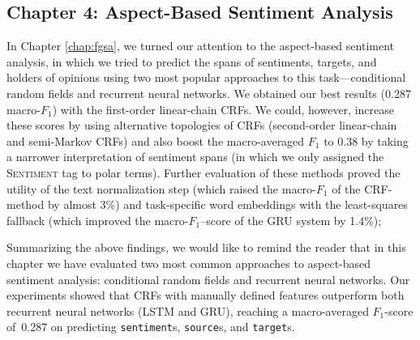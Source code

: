 \documentclass[11pt]{article}
\newcommand{\F}[0]{$F_1$}
\newcommand{\markable}[1]{\texttt{#1}}
\begin{document}
\subsection{Chapter 4: Aspect-Based Sentiment Analysis}

In Chapter \ref{chap:fgsa}, we turned our attention to the
aspect-based sentiment analysis, in which we tried to predict the
spans of sentiments, targets, and holders of opinions using two most
popular approaches to this task---conditional random fields and
recurrent neural networks.  We obtained our best results (0.287
macro-\F{}) with the first-order linear-chain CRFs.  We could,
however, increase these scores by using alternative topologies of CRFs
(second-order linear-chain and semi-Markov CRFs) and also boost the
macro-averaged \F{} to 0.38 by taking a narrower interpretation of
sentiment spans (in which we only assigned the \textsc{Sentiment} tag
to polar terms).  Further evaluation of these methods proved the
utility of the text normalization step (which raised the macro-\F{} of
the CRF-method by almost 3\%) and task-specific word embeddings with
the least-squares fallback (which improved the macro-\F{}--score of
the GRU system by 1.4\%);

Summarizing the above findings, we would like to remind the reader
that in this chapter we have evaluated two most common approaches to
aspect-based sentiment analysis: conditional random fields and
recurrent neural networks.  Our experiments showed that CRFs with
manually defined features outperform both recurrent neural networks
(LSTM and GRU), reaching a macro-averaged \F-score of~0.287 on
predicting \markable{sentiment}s, \markable{source}s, and
\markable{target}s.
\end{document}
